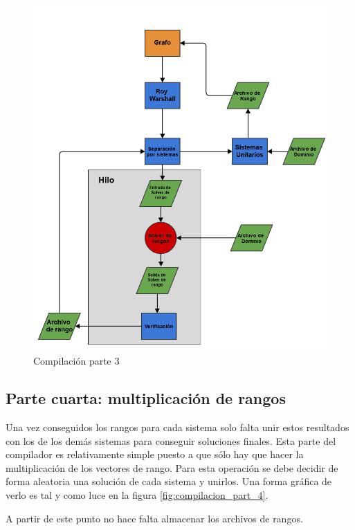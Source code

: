 \begin{figure}[h]
	\begin{center}
		\includegraphics[scale=0.4]{imagenes/Compilacion_parte_3.png}
	\end{center}
	\caption{
		\label{fig:compilacion_part_3}
		Compilación parte 3
	}
\end{figure}

\subsection{Parte cuarta: multiplicación de rangos}
Una vez conseguidos los rangos para cada sistema solo falta unir estos resultados 
con los de los demás sistemas para conseguir soluciones finales.
Esta parte del compilador es relativamente simple puesto a que sólo hay que hacer 
la multiplicación de los vectores de rango. Para esta operación se debe decidir 
de forma aleatoria una solución de cada sistema y unirlos. Una forma gráfica de 
verlo es tal y como luce en la figura \ref{fig:compilacion_part_4}.

A partir de este punto no hace falta almacenar los archivos de rangos.

